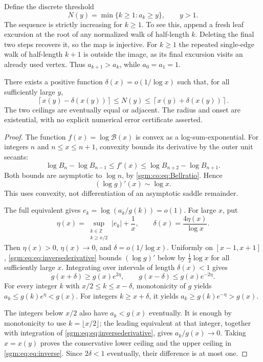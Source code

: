 \documentclass[11pt,letterpaper]{article}
\theoremstyle{remark}\newtheorem{remark}[theorem]{Remark}
\theoremstyle{definition}\newtheorem{definition}[theorem]{Definition}
\begin{document}
Define the discrete threshold
\[
 N(y)=\min\{k\ge1:a_k\ge y\},\qquad y>1.
\]
The sequence is strictly increasing for $k\ge1$. To see this, append a fresh leaf excursion at the root of any normalized walk of half-length $k$. Deleting the final two steps recovers it, so the map is injective. For $k\ge1$ the repeated single-edge walk of half-length $k+1$ is outside the image, as its final excursion visits an already used vertex. Thus $a_{k+1}>a_k$, while $a_0=a_1=1$.

\begin{proposition}\label{sgm:eq:prop:inverse}
There exists a positive function $\delta(x)=o(1/\log x)$ such that, for all sufficiently large $y$,
\begin{equation}\label{sgm:eq:eq:inverse}
 \left\lceil x(y)-\delta(x(y))\right\rceil
 \le N(y)\le
 \left\lceil x(y)+\delta(x(y))\right\rceil.
\end{equation}
The two ceilings are eventually equal or adjacent. The radius and onset are existential, with no explicit numerical error certificate asserted.
\end{proposition}
\begin{proof}
The function $f(x)=\log\mathcal B(x)$ is convex as a log-sum-exponential. For integers $n$ and $n\le x\le n+1$, convexity bounds its derivative by the outer unit secants:
\[
 \log B_n-\log B_{n-1}
 \le f'(x)\le\log B_{n+2}-\log B_{n+1}.
\]
Both bounds are asymptotic to $\log n$, by \eqref{sgm:co:eq:Bellratio}. Hence
\begin{equation}\label{sgm:eq:eq:inversederivative}
 (\log g)'(x)\sim\log x.
\end{equation}
This uses convexity, not differentiation of an asymptotic saddle remainder.

The full equivalent gives $e_k=\log(a_k/g(k))=o(1)$. For large $x$, put
\[
 \eta(x)=\sup_{\substack{k\in\mathbb Z\\k\ge x/2}}|e_k|+\frac1x,
 \qquad \delta(x)=\frac{4\eta(x)}{\log x}.
\]
Then $\eta(x)>0$, $\eta(x)\to0$, and $\delta=o(1/\log x)$. Uniformly on $[x-1,x+1]$, \eqref{sgm:eq:eq:inversederivative} bounds $(\log g)'$ below by $\tfrac12\log x$ for all sufficiently large $x$. Integrating over intervals of length $\delta(x)<1$ gives
\[
 g(x+\delta)\ge g(x)e^{2\eta},\qquad
 g(x-\delta)\le g(x)e^{-2\eta}.
\]
For every integer $k$ with $x/2\le k\le x-\delta$, monotonicity of $g$ yields
$a_k\le g(k)e^\eta<g(x)$. For integers $k\ge x+\delta$, it yields
$a_k\ge g(k)e^{-\eta}>g(x)$.

The integers below $x/2$ also have $a_k<g(x)$ eventually. It is enough by monotonicity to use $k=\lfloor x/2\rfloor$; the leading equivalent at that integer, together with integration of \eqref{sgm:eq:eq:inversederivative}, gives $a_k/g(x)\to0$. Taking $x=x(y)$ proves the conservative lower ceiling and the upper ceiling in \eqref{sgm:eq:eq:inverse}. Since $2\delta<1$ eventually, their difference is at most one.
\end{proof}
\end{document}
